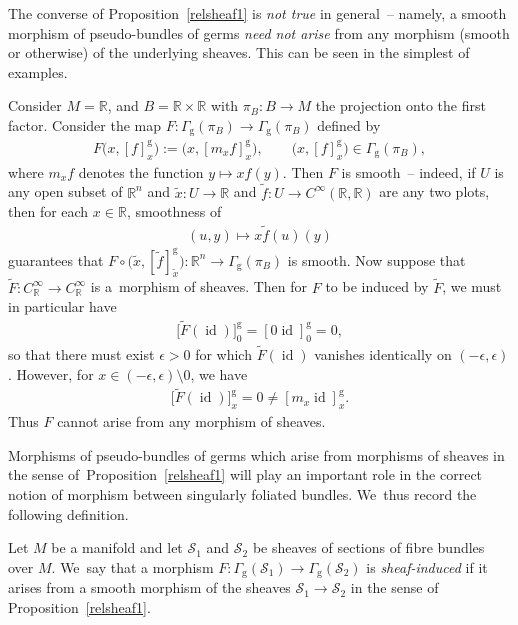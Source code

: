 \documentclass[pdftex]{sigma}
\numberwithin{equation}{section}
\def\g{\operatorname{g}}
\def\id{\operatorname{id}}
\def\SS{{\mathscr{S}}}
\def\RB{{\mathbb{R}}}
\begin{document}
The converse of Proposition~\ref{relsheaf1} is \textit{not true} in general~-- namely, a smooth morphism of pseudo-bundles of germs \textit{need not arise} from any morphism (smooth or otherwise) of the underlying sheaves. This can be seen in the simplest of examples.

\begin{Example}%
Consider $M = \RB$, and $B=\RB\times\RB$ with $\pi_{B}\colon B\rightarrow M$ the projection onto the first factor. Consider the map $F\colon \Gamma_{\g}(\pi_{B})\rightarrow\Gamma_{\g}(\pi_{B})$ defined by
\begin{gather*}
F\big(x,[f]^{\g}_{x}\big):=\big(x,[m_{x}f]^{\g}_{x}\big),\qquad \big(x,[f]^{\g}_{x}\big)\in\Gamma_{\g}(\pi_{B}),
\end{gather*}
where $m_{x}f$ denotes the function $y\mapsto xf(y)$. Then $F$ is smooth~-- indeed, if $U$ is any open subset of $\RB^{n}$ and $\tilde{x}\colon U\rightarrow\RB$ and $\tilde{f}\colon U\rightarrow C^{\infty}(\RB,\RB)$ are any two plots, then for each $x\in\RB$, smoothness of
\begin{gather*}
(u,y)\mapsto x\tilde{f}(u)(y)
\end{gather*}
guarantees that $F\circ\big(\tilde{x},[\tilde{f}]^{\g}_{\tilde{x}}\big)\colon \RB^{n}\rightarrow\Gamma_{\g}(\pi_{B})$ is smooth. Now suppose that $\tilde{F}\colon C^{\infty}_{\RB}\rightarrow C^{\infty}_{\RB}$ is a~morphism of sheaves. Then for $F$ to be induced by $\tilde{F}$, we must in particular have
\begin{gather*}
\big[\tilde{F}(\id)\big]^{\g}_{0} = [0\id]^{\g}_{0} = 0,
\end{gather*}
so that there must exist $\epsilon>0$ for which $\tilde{F}(\id)$ vanishes identically on $(-\epsilon,\epsilon)$. However, for $x\in(-\epsilon,\epsilon)\setminus 0$, we have
\begin{gather*}
\big[\tilde{F}(\id)\big]^{\g}_{x} = 0\neq[m_{x}\id]^{\g}_{x}.
\end{gather*}
Thus $F$ cannot arise from any morphism of sheaves.
\end{Example}

Morphisms of pseudo-bundles of germs which arise from morphisms of sheaves in the sense of~Pro\-position~\ref{relsheaf1} will play an important role in the correct notion of morphism between singularly foliated bundles. We~thus record the following definition.

\begin{Definition}
Let $M$ be a manifold and let $\SS_{1}$ and $\SS_{2}$ be sheaves of sections of fibre bundles over $M$. We~say that a morphism $F\colon \Gamma_{\g}(\SS_{1})\rightarrow\Gamma_{\g}(\SS_{2})$ is \textit{sheaf-induced} if it arises from a smooth morphism of the sheaves $\SS_{1}\rightarrow\SS_{2}$ in the sense of Proposition~\ref{relsheaf1}.
\end{Definition}
\end{document}
